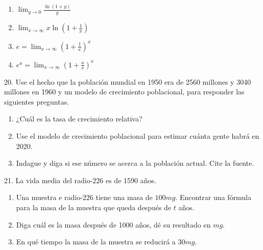 \documentclass[12pt]{article}
\begin{document}
\begin{enumerate}[\hspace{9px} a)]
    \item \(\displaystyle\lim_{y \to 0}\frac{\ln(1+y)}{y}\)

    \item \(\displaystyle\lim_{x \to \infty}x\ln\left(1+\frac{1}{x}\right)\)

    \item \(e=\displaystyle\lim_{x \to \infty}\left(1+\frac{1}{x}\right)^x\)

    \item \(e^a=\displaystyle\lim_{x \to \infty}\left(1+\frac{a}{x}\right)^x\)

\end{enumerate}

20. Use el hecho que la poblaci\'on mundial en 1950 era de 2560 millones y 3040 millones en 1960 y un modelo de crecimiento poblacional, para responder las siguientes preguntas.

\begin{enumerate}[\hspace{9px} a)]
    \item ¿Cuál es la tasa de crecimiento relativa?

    \item Use el modelo de crecimiento poblacional para estimar cuánta gente habrá en 2020.

    \item Indague y diga si ese número se acerca a la población actual. Cite la fuente.

\end{enumerate}

21. La vida media del radio-226 es de 1590 años.

\begin{enumerate}[\hspace{9px} a)]
    \item Una muestra e radio-226 tiene una masa de $100mg$. Encontrar una fórmula para la masa de la muestra que queda después de $t$ años.

    \item Diga cuál es la masa después de 1000 años, dé su resultado en $mg$.

    \item En qué tiempo la masa de la muestra se reducirá a $30mg$.

\end{enumerate}
\end{document}
